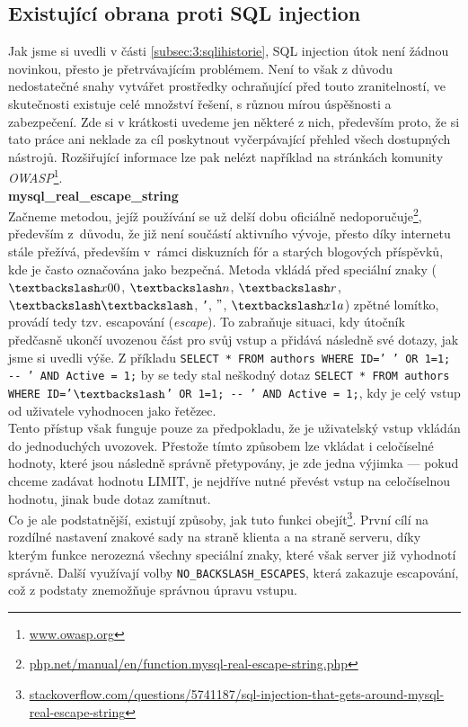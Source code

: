 \subsection{Existující obrana proti SQL injection}\label{subsec:3:tools}
Jak jsme si uvedli v části \ref{subsec:3:sqlihistorie}, SQL injection útok není žádnou novinkou, přesto je přetrvávajícím problémem. 
Není to však z důvodu nedostatečné snahy vytvářet prostředky ochraňující před touto zranitelností, ve skutečnosti existuje celé množství 
řešení, s různou mírou úspěšnosti a zabezpečení. Zde si v krátkosti uvedeme jen některé z nich, především proto, že si tato práce ani neklade za cíl 
poskytnout vyčerpávající přehled všech dostupných nástrojů. Rozšiřující informace lze pak nelézt například na stránkách komunity 
\textit{OWASP}\footnote{\url{www.owasp.org}}. \\

\Bat{} \textbf{mysql\_real\_escape\_string} \\
Začneme metodou, jejíž používání se už delší dobu oficiálně nedoporučuje\footnote{\url{php.net/manual/en/function.mysql-real-escape-string.php}},
především z~důvodu, že již není součástí aktivního vývoje, přesto díky internetu stále přežívá, především v~rámci diskuzních fór a starých blogových příspěvků, 
kde je často označována jako bezpečná.
\newpage
Metoda vkládá před speciální znaky ($\textbackslash x00$, $\textbackslash n$, $\textbackslash r$, $\textbackslash \textbackslash$, 
\texttt{'}, $"$, $\textbackslash x1a$) zpětné lomítko, provádí tedy tzv. escapování (\textit{escape}). To zabraňuje situaci, kdy útočník předčasně 
ukončí uvozenou část pro svůj vstup a přidává následně své dotazy, jak jsme si uvedli výše. Z příkladu 
\texttt{SELECT * FROM authors WHERE ID=' ' OR 1=1; -{}- ' AND Active = 1;} by se tedy stal neškodný dotaz 
\texttt{SELECT * FROM authors WHERE ID='$\textbackslash$' OR 1=1; -{}- ' AND Active = 1;}, kdy je celý vstup od uživatele vyhodnocen 
jako řetězec. \\ 

Tento přístup však funguje pouze za předpokladu, že je uživatelský vstup vkládán do jednoduchých uvozovek. Přestože tímto způsobem lze vkládat
i celočíselné hodnoty, které jsou následně správně přetypovány, je zde jedna výjimka --- pokud chceme zadávat hodnotu LIMIT, je nejdříve nutné převést
vstup na celočíselnou hodnotu, jinak bude dotaz zamítnut. \\

Co je ale podstatnější, existují způsoby, jak tuto funkci 
obejít\footnote{\url{stackoverflow.com/questions/5741187/sql-injection-that-gets-around-mysql-real-escape-string}}. 
První cílí na rozdílné nastavení znakové sady na straně klienta a na straně serveru, díky kterým funkce nerozezná všechny speciální znaky,
které však server již vyhodnotí správně. Další využívají volby \texttt{NO\_BACKSLASH\_ESCAPES}, která zakazuje escapování,
což z podstaty znemožňuje správnou úpravu vstupu. \\

